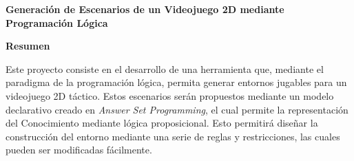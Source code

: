 \documentclass[12pt, a4paper]{report}
\begin{document}
\vspace*{4em}
{\large\bfseries{Generación de Escenarios de un Videojuego 2D mediante Programación Lógica}\par}
\vspace*{2em}
{\large\bfseries{Resumen}\par}
\vspace*{2em}
{Este proyecto consiste en el desarrollo de una herramienta que, mediante el paradigma de la programación lógica, permita generar entornos jugables para un videojuego 2D táctico. Estos escenarios serán propuestos mediante un modelo declarativo creado en \textit{Answer Set Programming}, el cual permite la representación del Conocimiento mediante lógica proposicional. Esto permitirá diseñar la construcción del entorno mediante una serie de reglas y restricciones, las cuales pueden ser modificadas fácilmente.\par}
\vspace*{\fill}
\end{document}
